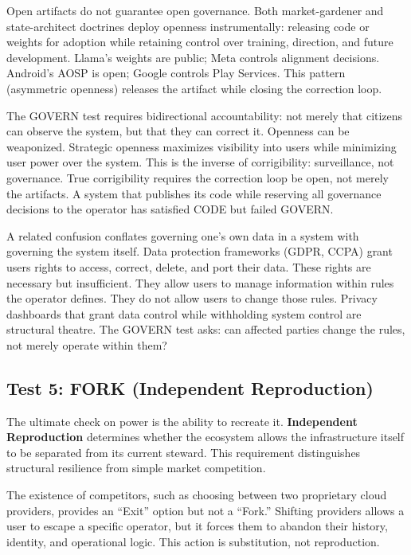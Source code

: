 \documentclass{article}
\begin{document}
Open artifacts do not guarantee open governance. Both market-gardener and state-architect doctrines deploy openness instrumentally: releasing code or weights for adoption while retaining control over training, direction, and future development. Llama's weights are public; Meta controls alignment decisions. Android's AOSP is open; Google controls Play Services. This pattern (asymmetric openness) releases the artifact while closing the correction loop.

The GOVERN test requires bidirectional accountability: not merely that citizens can observe the system, but that they can correct it. Openness can be weaponized. Strategic openness maximizes visibility into users while minimizing user power over the system. This is the inverse of corrigibility: surveillance, not governance. True corrigibility requires the correction loop be open, not merely the artifacts. A system that publishes its code while reserving all governance decisions to the operator has satisfied CODE but failed GOVERN.

A related confusion conflates governing one's own data in a system with governing the system itself. Data protection frameworks (GDPR, CCPA) grant users rights to access, correct, delete, and port their data. These rights are necessary but insufficient. They allow users to manage information within rules the operator defines. They do not allow users to change those rules. Privacy dashboards that grant data control while withholding system control are structural theatre. The GOVERN test asks: can affected parties change the rules, not merely operate within them?

\subsection{Test 5: FORK (Independent Reproduction)}

The ultimate check on power is the ability to recreate it. \textbf{Independent Reproduction} determines whether the ecosystem allows the infrastructure itself to be separated from its current steward. This requirement distinguishes structural resilience from simple market competition.

The existence of competitors, such as choosing between two proprietary cloud providers, provides an ``Exit'' option but not a ``Fork.'' Shifting providers allows a user to escape a specific operator, but it forces them to abandon their history, identity, and operational logic. This action is substitution, not reproduction.
\end{document}
